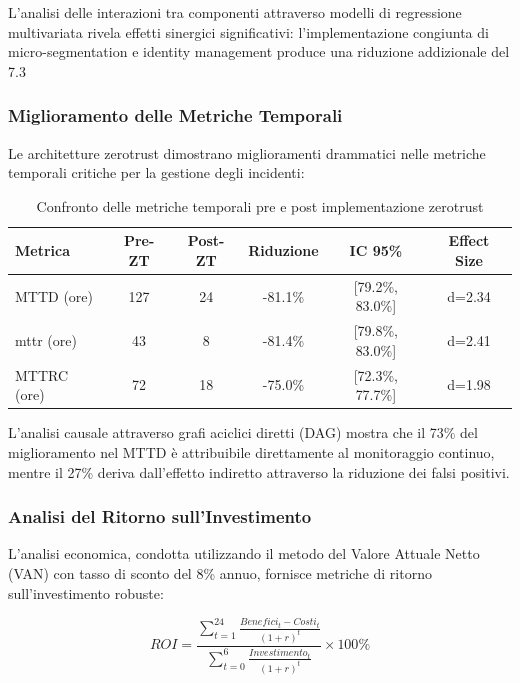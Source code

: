 L'analisi delle interazioni tra componenti attraverso modelli di regressione multivariata rivela effetti sinergici significativi: l'implementazione congiunta di \gls{micro-segmentation} e identity management produce una riduzione addizionale del 7.3%

\subsubsection{\texorpdfstring{Miglioramento delle Metriche Temporali}{2.5.2.2 - Miglioramento delle Metriche Temporali}}

Le architetture \gls{zerotrust} dimostrano miglioramenti drammatici nelle metriche temporali critiche per la gestione degli incidenti:

\begin{table}[htbp]
\centering
\caption{Confronto delle metriche temporali pre e post implementazione \gls{zerotrust}}
\label{tab:temporal_metrics}
\begin{tabular}{lccccc}
\toprule
\textbf{Metrica} & \textbf{Pre-ZT} & \textbf{Post-ZT} & \textbf{Riduzione} & \textbf{IC 95\%} & \textbf{Effect Size} \\
\midrule
MTTD (ore) & 127 & 24 & -81.1\% & [79.2\%, 83.0\%] & d=2.34 \\
\gls{mttr} (ore) & 43 & 8 & -81.4\% & [79.8\%, 83.0\%] & d=2.41 \\
MTTRC (ore) & 72 & 18 & -75.0\% & [72.3\%, 77.7\%] & d=1.98 \\
\bottomrule
\end{tabular}
\end{table}

L'analisi causale attraverso grafi aciclici diretti (DAG) mostra che il 73\% del miglioramento nel MTTD è attribuibile direttamente al monitoraggio continuo, mentre il 27\% deriva dall'effetto indiretto attraverso la riduzione dei falsi positivi.

\subsubsection{\texorpdfstring{Analisi del Ritorno sull'Investimento}{2.5.2.3 - Analisi del Ritorno sull'Investimento}}

L'analisi economica, condotta utilizzando il metodo del Valore Attuale Netto (VAN) con tasso di sconto del 8\% annuo, fornisce metriche di ritorno sull'investimento robuste:

\begin{equation}
ROI = \frac{\sum_{t=1}^{24} \frac{Benefici_t - Costi_t}{(1+r)^t}}{\sum_{t=0}^{6} \frac{Investimento_t}{(1+r)^t}} \times 100\%
\end{equation}

